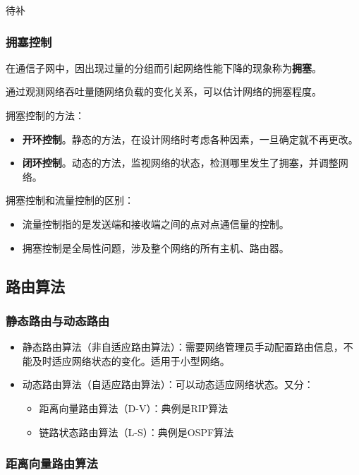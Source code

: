\documentclass[12pt, a4paper, oneside]{ctexart}
\begin{document}
待补

\subsubsection{拥塞控制}

在通信子网中，因出现过量的分组而引起网络性能下降的现象称为\textbf{拥塞}。

通过观测网络吞吐量随网络负载的变化关系，可以估计网络的拥塞程度。

拥塞控制的方法：
\begin{itemize}
    \item {\bf 开环控制}。静态的方法，在设计网络时考虑各种因素，一旦确定就不再更改。
    \item {\bf 闭环控制}。动态的方法，监视网络的状态，检测哪里发生了拥塞，并调整网络。
\end{itemize}

拥塞控制和流量控制的区别：
\begin{itemize}
    \item 流量控制指的是发送端和接收端之间的点对点通信量的控制。
    \item 拥塞控制是全局性问题，涉及整个网络的所有主机、路由器。
\end{itemize}

\subsection{路由算法}

\subsubsection{静态路由与动态路由}

\begin{itemize}
    \item 静态路由算法（非自适应路由算法）：需要网络管理员手动配置路由信息，不能及时适应网络状态的变化。适用于小型网络。
    \item 动态路由算法（自适应路由算法）：可以动态适应网络状态。又分：
    \begin{itemize}
        \item 距离向量路由算法（D-V）：典例是RIP算法
        \item 链路状态路由算法（L-S）：典例是OSPF算法
    \end{itemize}
\end{itemize}

\subsubsection{距离向量路由算法}
\end{document}
